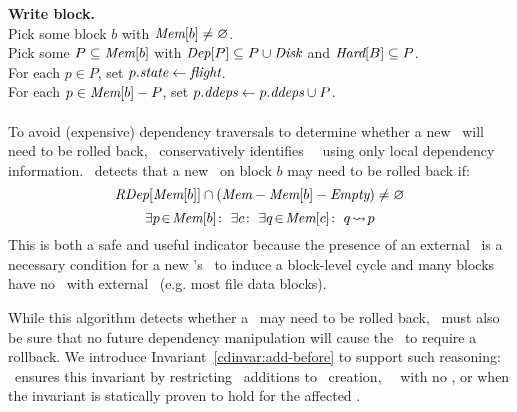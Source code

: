 \begin{tabbing}
\textbf{Write block.} \\
\quad Pick some block $b$ with $\PMem[b] \neq \emptyset$. \\
\quad Pick some $P \subseteq \PMem[b]$ with $\PDepset{P} \subseteq P \cup
\PDisk$ and $\PHard[B] \subseteq P$. \\
\quad For each $p \in P$, set $p.\textit{state} \gets \textit{flight}$. \\
\quad For each $p \in \PMem[b]-P$, set $\PDDepset{p} \gets \PDDepset{p}
\cup P$.
\end{tabbing}

\paragraph{}
To avoid (expensive) dependency traversals to determine whether a new
\chdesc\ will need to be rolled back,
%
\Kudos\ conservatively identifies \nrb\ \chdescs\ using only local
dependency information.
%
\Kudos\ detects that a new \chdesc\ on block $b$ may need to be rolled back if:
%
%
\[ \PRDepset{\PMem[b]} \cap (\PMem - \PMem[b] - \PEmpty) \ne \emptyset \]
\[ \exists \inset{p}{\PMem[b]}\!:\
   \exists c\!:\ \exists \inset{q}{\PMem[c]}\!:\
   \indirdepends{q}{p} \]
%
This is both a safe and useful indicator because
%
the presence of an external \after\ is a necessary condition for a new
\chdesc's \before\ to induce a block-level cycle
%
and many blocks have no \chdescs\ with external \afters\ (e.g. most
file data blocks).

While this algorithm detects whether a \chdesc\ may need to be rolled
back, \Kudos\ must also be sure that no future dependency manipulation
will cause the \chdesc\ to require a rollback.
%
We introduce Invariant~\ref{cdinvar:add-before} to support such reasoning:
%
%
\noindent \Kudos\ ensures this invariant by restricting \before\
additions to \chdesc\ creation, \noop\ \chdescs\ with no \afters, or
when the invariant is statically proven to hold for the affected
\chdescs.
